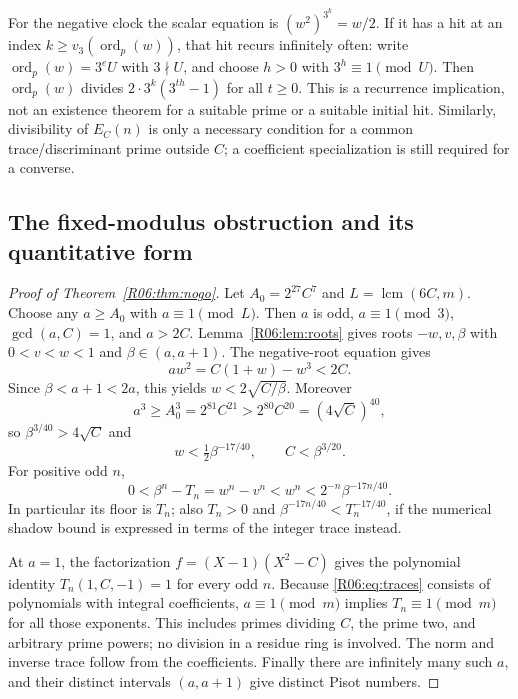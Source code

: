 \documentclass[11pt,a4paper]{article}
\theoremstyle{definition}\newtheorem{definition}[theorem]{Definition}
\theoremstyle{remark}\newtheorem{remark}[theorem]{Remark}
\DeclareMathOperator{\lcm}{lcm}\DeclareMathOperator{\disc}{disc}\DeclareMathOperator{\Res}{Res}
\begin{document}
For the negative clock the scalar equation is
$(w^2)^{3^k}=w/2$. If it has a hit at an index
$k\ge v_3(\operatorname{ord}_p(w))$, that hit recurs infinitely often:
write $\operatorname{ord}_p(w)=3^eU$ with $3\nmid U$, and choose
$h>0$ with $3^h\equiv1\pmod U$.
Then $\operatorname{ord}_p(w)$ divides $2\cdot3^k(3^{th}-1)$ for
all $t\ge0$. This is a recurrence implication, not an existence
theorem for a suitable prime or a suitable initial hit.
Similarly, divisibility of $E_C(n)$ is only a necessary condition
for a common trace/discriminant prime outside $C$; a coefficient
specialization is still required for a converse.

\subsection{The fixed-modulus obstruction and its quantitative form}
\label{R06:sec:nogo}

\begin{proof}[Proof of Theorem~\ref{R06:thm:nogo}]
Let $A_0=2^{27}C^7$ and $L=\lcm(6C,m)$.
Choose any $a\ge A_0$ with $a\equiv1\pmod L$.
Then $a$ is odd, $a\equiv1\pmod3$, $\gcd(a,C)=1$, and $a>2C$.
Lemma~\ref{R06:lem:roots} gives roots $-w,v,\beta$ with
$0<v<w<1$ and $\beta\in(a,a+1)$.
The negative-root equation gives
\[
 aw^2=C(1+w)-w^3<2C.
\]
Since $\beta<a+1<2a$, this yields $w<2\sqrt{C/\beta}$.
Moreover
\[
 a^3\ge A_0^3=2^{81}C^{21}>2^{80}C^{20}=(4\sqrt C)^{40},
\]
so $\beta^{3/40}>4\sqrt C$ and
\[
 w<\tfrac12\beta^{-17/40},\qquad C<\beta^{3/20}.
\]
For positive odd $n$,
\[
 0<\beta^n-T_n=w^n-v^n<w^n
 <2^{-n}\beta^{-17n/40}.
\]
In particular its floor is $T_n$; also $T_n>0$ and
$\beta^{-17n/40}<T_n^{-17/40}$, if the numerical shadow bound is
expressed in terms of the integer trace instead.

At $a=1$, the factorization $f=(X-1)(X^2-C)$ gives the polynomial
identity $T_n(1,C,-1)=1$ for every odd $n$.
Because \eqref{R06:eq:traces} consists of polynomials with integral
coefficients, $a\equiv1\pmod m$ implies $T_n\equiv1\pmod m$ for
all those exponents. This includes primes dividing $C$, the prime
two, and arbitrary prime powers; no division in a residue ring is
involved. The norm and inverse trace follow from the coefficients.
Finally there are infinitely many such $a$, and their distinct
intervals $(a,a+1)$ give distinct Pisot numbers.
\end{proof}
\end{document}
